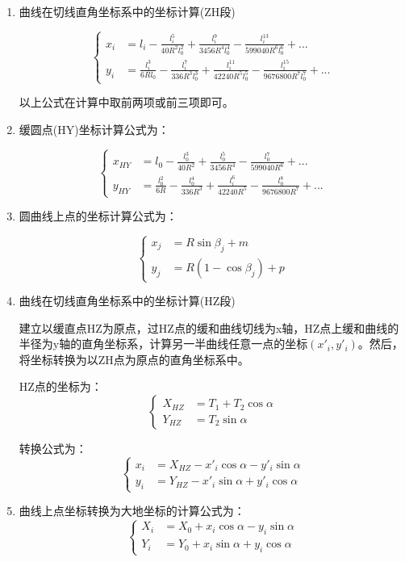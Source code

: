 \begin{enumerate}

\item  曲线在切线直角坐标系中的坐标计算(ZH段)

\[
\left \{ \begin{aligned}
x_i &= l_i - \frac{l^5_i}{40R^2 l^2_0} + \frac{l^9_i}{3456R^4 l^4_0} - \frac{l^{13}_i}{599040R^6l^6_0} + ...  \\
y_i &=  \frac{l^3_i}{6Rl_0} - \frac{l^7_i}{336R^3 l^3_0} + \frac{l^{11}_i}{42240R^5l^5_0} -\frac{l^{15}_i}{9676800R^7l^7_0}+ ...  
\end{aligned} \right.
\]

以上公式在计算中取前两项或前三项即可。

\item  缓圆点(HY)坐标计算公式为：

\[
\left \{ \begin{aligned}
x_{HY} &= l_0 - \frac{l^3_0}{40R^2} + \frac{l^5_0}{3456R^4} - \frac{l^{7}_0}{599040R^6} + ...  \\
y_{HY} &=  \frac{l^2_0}{6R} - \frac{l^4_0}{336R^3} + \frac{l^{6}_i}{42240R^5} -\frac{l^{8}_0}{9676800R^7}+ ...  
\end{aligned} \right.
\]

\item  圆曲线上点的坐标计算公式为：

\[
\left \{ \begin{aligned}
x_{j} &= R \sin \beta_j + m \\
y_{j} &= R(1- \cos \beta_j) +p 
\end{aligned} \right.
\]

\item  曲线在切线直角坐标系中的坐标计算(HZ段)

建立以缓直点HZ为原点，过HZ点的缓和曲线切线为x轴，HZ点上缓和曲线的
半径为y轴的直角坐标系，计算另一半曲线任意一点的坐标$(x'_i, y'_i)$。然后，
将坐标转换为以ZH点为原点的直角坐标系中。

HZ点的坐标为：
\[
\left \{ \begin{aligned}
X_{HZ} &= T_1 + T_2 \cos \alpha \\
Y_{HZ} &=  T_2 \sin \alpha 
\end{aligned} \right.
\]

转换公式为：
\[
\left \{ \begin{aligned}
x_i &= X_{HZ} - x'_i  \cos \alpha - y'_i \sin \alpha \\
y_i &= Y_{HZ}  -  x'_i \sin \alpha + y'_i \cos \alpha 
\end{aligned} \right.
\]

\item 曲线上点坐标转换为大地坐标的计算公式为：
\[
\left \{ \begin{aligned}
X_{i} &= X_0 + x_i \cos \alpha - y_i \sin \alpha \\
Y_{i} &= Y_0 + x_i \sin \alpha + y_i \cos \alpha 
\end{aligned} \right.
\]

\end{enumerate}